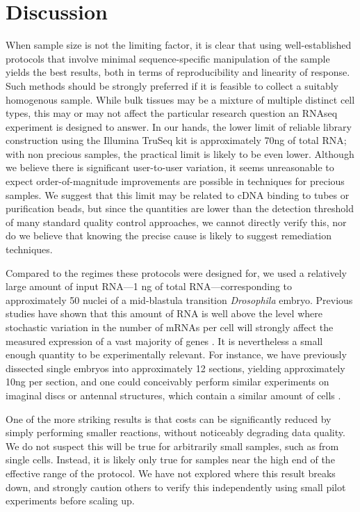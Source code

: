 \section{Discussion}


When sample size is not the limiting factor, it is clear that using well-established protocols that involve minimal sequence-specific manipulation of the sample yields the best results, both in terms of reproducibility and linearity of response. Such methods should be strongly preferred if it is feasible to collect a suitably homogenous sample. While bulk tissues may be a mixture of multiple distinct cell types, this may or may not affect the particular research question an RNAseq experiment is designed to answer.  In our hands, the lower limit of reliable library construction using the Illumina TruSeq kit is approximately 70ng of total RNA; with non precious samples, the practical limit is likely to be even lower. Although we believe there is significant user-to-user variation, it seems unreasonable to expect order-of-magnitude improvements are possible in techniques for precious samples. We suggest that this limit may be related to cDNA binding to tubes or purification beads, but since the quantities are lower than the detection threshold of many standard quality control approaches, we cannot directly verify this, nor do we believe that knowing the precise cause is likely to suggest remediation techniques.


Compared to the regimes these protocols were designed for, we used a relatively large amount of input RNA---1 ng of total RNA---corresponding to approximately 50 nuclei of a mid-blastula transition {\em Drosophila} embryo. Previous studies have shown that this amount of RNA is well above the level where stochastic variation in the number of mRNAs per cell will strongly affect the measured expression of a vast majority of genes \cite{Marinov:2013fm}. It is nevertheless a small enough quantity to be experimentally relevant.  For instance, we have previously dissected single embryos into approximately 12 sections, yielding approximately 10ng per section\cite{Combs:2013jy}, and one could conceivably perform similar experiments on imaginal discs or antennal structures, which contain a similar amount of cells \cite{Klebes:2002ua,Hansson:2000cx}.

One of the more striking results is that costs can be significantly reduced by simply performing smaller reactions, without noticeably degrading data quality.  We do not suspect this will be true for arbitrarily small samples, such as from single cells.  Instead, it is likely only true for samples near the high end of the effective range of the protocol. We have not explored where this result breaks down, and strongly caution others to verify this independently using small pilot experiments before scaling up.
